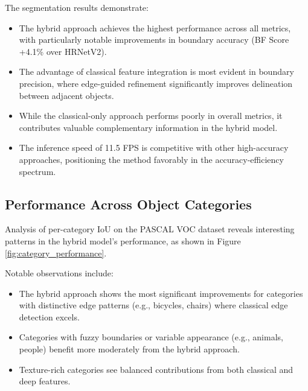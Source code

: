 The segmentation results demonstrate:

\begin{itemize}
    \item The hybrid approach achieves the highest performance across all metrics, with particularly notable improvements in boundary accuracy (BF Score +4.1\% over HRNetV2).
    
    \item The advantage of classical feature integration is most evident in boundary precision, where edge-guided refinement significantly improves delineation between adjacent objects.
    
    \item While the classical-only approach performs poorly in overall metrics, it contributes valuable complementary information in the hybrid model.
    
    \item The inference speed of 11.5 FPS is competitive with other high-accuracy approaches, positioning the method favorably in the accuracy-efficiency spectrum.
\end{itemize}

\subsection{Performance Across Object Categories}
Analysis of per-category IoU on the PASCAL VOC dataset reveals interesting patterns in the hybrid model's performance, as shown in Figure \ref{fig:category_performance}.


Notable observations include:

\begin{itemize}
    \item The hybrid approach shows the most significant improvements for categories with distinctive edge patterns (e.g., bicycles, chairs) where classical edge detection excels.
    
    \item Categories with fuzzy boundaries or variable appearance (e.g., animals, people) benefit more moderately from the hybrid approach.
    
    \item Texture-rich categories see balanced contributions from both classical and deep features.
\end{itemize}

